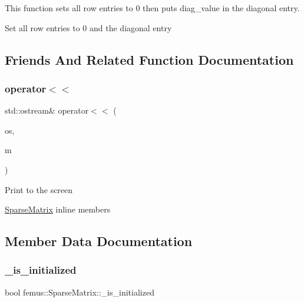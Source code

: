 This function sets all row entries to 0 then puts diag\+\_\+value in the diagonal entry. 

Set all row entries to 0 and the diagonal entry 

\subsection{Friends And Related Function Documentation}
\mbox{\label{classfemus_1_1_sparse_matrix_a9609c062064d21c2cb7073d8ec1f92a9}} 
\subsubsection{\texorpdfstring{operator$<$$<$}{operator<<}}
{\footnotesize\ttfamily std\+::ostream\& operator$<$$<$ (\begin{DoxyParamCaption}\item[{std\+::ostream \&}]{os,  }\item[{const \mbox{\hyperlink{classfemus_1_1_sparse_matrix}{Sparse\+Matrix}} \&}]{m }\end{DoxyParamCaption})\hspace{0.3cm}{\ttfamily [friend]}}

Print to the screen

\mbox{\hyperlink{classfemus_1_1_sparse_matrix}{Sparse\+Matrix}} inline members 

\subsection{Member Data Documentation}
\mbox{\label{classfemus_1_1_sparse_matrix_a948fb0d5a46d57bcc329383e787f6977}} 
\subsubsection{\texorpdfstring{\+\_\+is\+\_\+initialized}{\_is\_initialized}}
{\footnotesize\ttfamily bool femus\+::\+Sparse\+Matrix\+::\+\_\+is\+\_\+initialized\hspace{0.3cm}{\ttfamily [protected]}}

